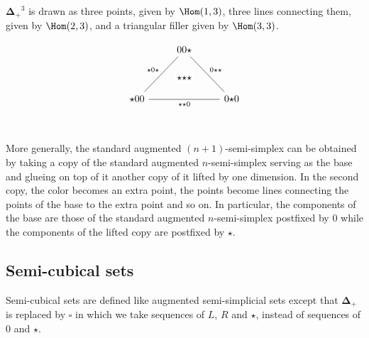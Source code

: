 \documentclass[10pt]{art.cls/art}
\newcommand{\DeltaPlus}{\ensuremath{\boldsymbol{\Delta}_+}}
\newcommand{\Cube}{\ensuremath{\boldsymbol{\square}}}
\newcommand{\kstar}{{\star}}
\begin{document}
\begin{example}[$\DeltaPlus^3$]
  $\DeltaPlus^3$ is drawn as three points, given by $\Hom(1, 3)$, three lines connecting them, given by $\Hom(2, 3)$, and a triangular filler given by $\Hom(3, 3)$.

  \begin{equation*}
    \begin{tikzcd}
      & |[alias=F]|00\kstar \arrow[ddr, dash, "0\kstar\kstar"] & \\\\
      \kstar00 \arrow[rr, dash, "\kstar\kstar0"{name=T, below}]\arrow[uur, dash, "\kstar0\kstar"] && 0\kstar0 \\
      \arrow[rightarrow, from=F, to=T, phantom, "\kstar\kstar\kstar" description]
    \end{tikzcd}
  \end{equation*}
\end{example}

More generally, the standard augmented $(n+1)$-semi-simplex can be obtained by taking a copy of the standard augmented $n$-semi-simplex serving as the base and glueing on top of it another copy of it lifted by one dimension. In the second copy, the color becomes an extra point, the points become lines connecting the points of the base to the extra point and so on. In particular, the components of the base are those of the standard augmented $n$-semi-simplex postfixed by $0$ while the components of the lifted copy are postfixed by $\kstar$.

\subsection{Semi-cubical sets}
Semi-cubical sets are defined like augmented semi-simplicial sets except that $\DeltaPlus$ is replaced by $\Cube$ in which we take sequences of $L$, $R$ and $\star$, instead of sequences of $0$ and $\kstar$.
\end{document}
